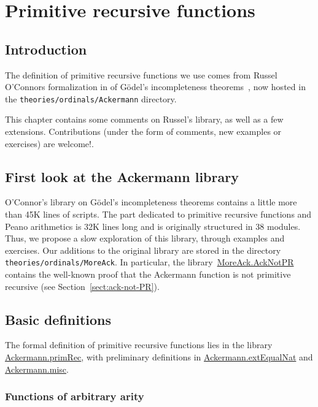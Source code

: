 \chapter{Primitive recursive functions}

\section{Introduction}
The definition of primitive recursive functions we use comes
from Russel O'Connors formalization in \coq{} of
G\"odel's incompleteness theorems~\cite{OConnor05}, now hosted in
the \texttt{theories/ordinals/Ackermann} directory.

This chapter contains some comments on Russel's library, as well as a few extensions.
Contributions (under the form of comments, new examples or exercises) are welcome!. 

\section{First look at the Ackermann library}

O'Connor's library on Gödel's incompleteness theorems contains a little more 
than 45K lines of scripts. The part dedicated to primitive recursive functions and Peano arithmetics is 32K lines long and is originally structured in 38 modules.
Thus, we propose a slow exploration of this library, through examples and exercises. Our additions to the original library 
are stored in the directory \texttt{theories/ordinals/MoreAck}.
In particular, the library~\href{../theories/html/hydras.MoreAck.AckNotPR.html}{MoreAck.AckNotPR} contains the well-known  proof that the Ackermann function is not primitive recursive (see Section~\vref{sect:ack-not-PR}).

\section{Basic definitions}

The formal definition of primitive recursive functions lies in the library
\href{../theories/html/hydras.Ackermann.primRec.html}{Ackermann.primRec},
with preliminary definitions in 
\href{../theories/html/hydras.Ackermann.extEqualNat.html}{Ackermann.extEqualNat}
and
\href{../theories/html/hydras.Ackermann.misc.html}{Ackermann.misc}.

\subsection{Functions of arbitrary arity}

